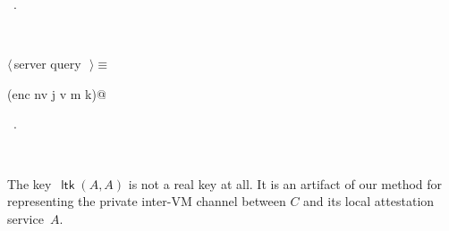 \documentclass[titlepage,12pt]{article}
\theoremstyle{definition}
\DeclareMathOperator{\ltk}{\mathsf{ltk}}
\begin{document}
\begin{description}
\begin{flushleft}
\begin{minipage}{\linewidth}
\begin{list}{}{\setlength{\itemsep}{-\parsep}\setlength{\itemindent}{-\leftmargin}}
\item \NWtxtMacroRefIn\ .
\end{list}
\end{minipage}\\[4ex]
\end{flushleft}
\item[$S\to C:\stoca$]
\begin{flushleft} \small
\begin{minipage}{\linewidth} \label{scrap5}
$\langle\,$server query\nobreak\ {\footnotesize {}}$\,\rangle\equiv$
\vspace{-1ex}
\begin{list}{}{} \item
\mbox{}\verb@(enc nv j v m k)@{\NWsep}
\end{list}
\vspace{-1ex}
\footnotesize\addtolength{\baselineskip}{-1ex}
\begin{list}{}{\setlength{\itemsep}{-\parsep}\setlength{\itemindent}{-\leftmargin}}
\item \NWtxtMacroRefIn\ .
\end{list}
\end{minipage}\\[4ex]
\end{flushleft}
\item[$C\to A:\ctoaa\colon$]
The key~${\ltk(A,A)}$ is not a real key at all.  It is an artifact of
our method for representing the private inter-VM channel between $C$
and its local attestation service~$A$.


\end{description}
\end{document}
